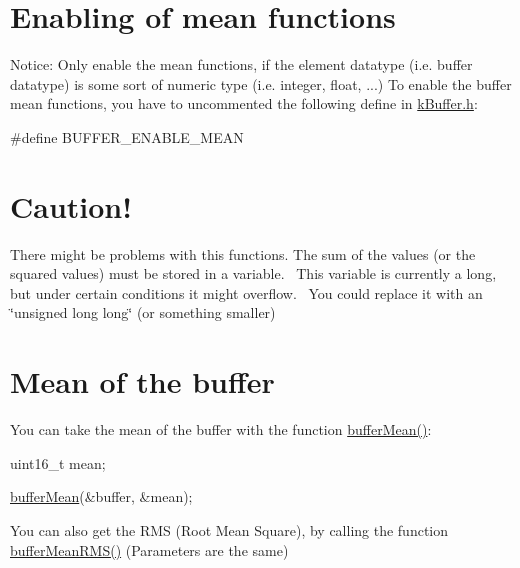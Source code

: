 \hypertarget{mean_enabling}{}\section{Enabling of mean functions}\label{mean_enabling}
Notice\+: Only enable the mean functions, if the element datatype (i.\+e. buffer datatype) is some sort of numeric type (i.\+e. integer, float, ...) To enable the buffer mean functions, you have to uncommented the following define in \hyperlink{k_buffer_8h}{k\+Buffer.\+h}\+: 
\begin{DoxyCode}
\textcolor{preprocessor}{#define BUFFER\_ENABLE\_MEAN}
\end{DoxyCode}
 \hypertarget{mean_caution}{}\section{Caution!}\label{mean_caution}
There might be problems with this functions. The sum of the values (or the squared values) must be stored in a variable.~\newline
 This variable is currently a long, but under certain conditions it might overflow.~\newline
 You could replace it with an \char`\"{}unsigned long long\char`\"{} (or something smaller) \hypertarget{mean_meanfunc}{}\section{Mean of the buffer}\label{mean_meanfunc}
You can take the mean of the buffer with the function \hyperlink{k_buffer_8c_a1389f5c08210e077301c35bc3b43f681}{buffer\+Mean()}\+: 
\begin{DoxyCode}
uint16\_t mean;

\hyperlink{k_buffer_8c_a1389f5c08210e077301c35bc3b43f681}{bufferMean}(&buffer, &mean);
\end{DoxyCode}
 You can also get the R\+M\+S (Root Mean Square), by calling the function \hyperlink{k_buffer_8c_a1da694b34c0a52809c923d2d149d1348}{buffer\+Mean\+R\+M\+S()} (Parameters are the same) 